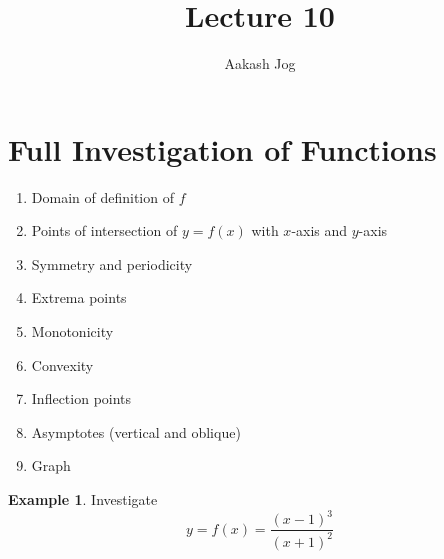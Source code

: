 \documentclass[fleqn]{article}
\title{Lecture 10}
\author{Aakash Jog}
\date{\formatdate{25}{11}{2014}}
\theoremstyle{definition}
\newtheorem{example}{Example}
\theoremstyle{theorem}
\theoremstyle{remark}
\begin{document}
	
\maketitle

\tableofcontents

\newpage

\section{Full Investigation of Functions}

\begin{enumerate}
	\item Domain of definition of $f$
	\item Points of intersection of $y = f(x)$ with $x$-axis and $y$-axis
	\item Symmetry and periodicity
	\item Extrema points
	\item Monotonicity
	\item Convexity
	\item Inflection points
	\item Asymptotes (vertical and oblique)
	\item Graph
\end{enumerate}

\begin{example}
	Investigate
	\begin{equation*}
		y = f(x) =\dfrac{(x-1)^3}{(x+1)^2}
	\end{equation*}
\end{example}
\end{document}
